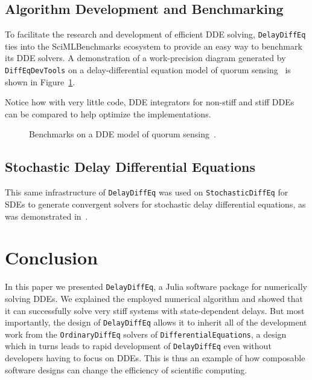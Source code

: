 \documentclass{juliacon}
\def\pkg#1{\texttt{#1}}
\begin{document}


\subsection{Algorithm Development and Benchmarking}

To facilitate the research and development of efficient DDE solving, \pkg{DelayDiffEq}
ties into the SciMLBenchmarks ecosystem to provide an easy way to benchmark its 
DDE solvers.
A demonstration of a work-precision diagram generated by \pkg{DiffEqDevTools}
on a delay-differential equation model of quorum sensing~\cite{BuddrusSchiemann2014} is shown in Figure~\ref{fig:benchmark}.



Notice how with very
little code, DDE integrators for non-stiff and stiff DDEs can be compared to help
optimize the implementations.

\begin{figure}
    \centering
    
    \caption{Benchmarks on a DDE model of quorum sensing~\cite{BuddrusSchiemann2014}.}
    \label{fig:benchmark}
\end{figure}

\subsection{Stochastic Delay Differential Equations}

This same infrastructure of \pkg{DelayDiffEq} was used on \pkg{StochasticDiffEq} for SDEs to generate convergent solvers for stochastic delay differential equations, as was demonstrated in~\cite{sykora2020stochasticdelaydiffeq}.

\section{Conclusion}

In this paper we presented \pkg{DelayDiffEq}, a Julia software package for numerically solving DDEs.
We explained the employed numerical algorithm and showed that it can successfully
solve very stiff systems with state-dependent delays. But most importantly, the design of \pkg{DelayDiffEq}
allows it to inherit all of the development work from the \pkg{OrdinaryDiffEq} solvers 
of \pkg{DifferentialEquations}, a design which in turns leads to rapid development of
\pkg{DelayDiffEq} even without developers having to focus on DDEs. This is thus an example of how
composable software designs can change the efficiency of scientific computing.
\end{document}
